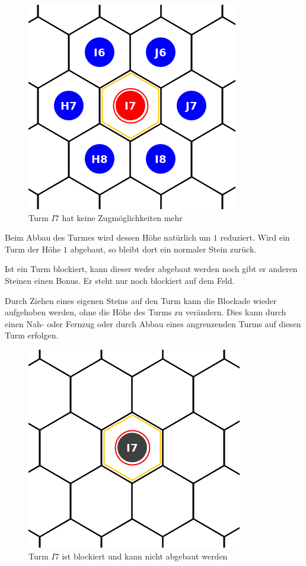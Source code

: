 \begin{figure}[ht]
\begin{center}
\includegraphics[scale=0.25]{graphic/neighbor-blocked-tower.png}
\end{center}
\caption*{Turm $I7$ hat keine Zugmöglichkeiten mehr}
\end{figure}

Beim Abbau des Turmes wird dessen Höhe natürlich um $1$ reduziert. Wird ein Turm der Höhe $1$ abgebaut, so bleibt dort ein normaler Stein zurück.

Ist ein Turm blockiert, kann dieser weder abgebaut werden noch gibt er anderen Steinen einen Bonus. Er steht nur noch blockiert auf dem Feld. 

Durch Ziehen eines eigenen Steins auf den Turm kann die Blockade wieder aufgehoben werden, ohne die Höhe des Turms zu verändern. Dies kann durch einen Nah- oder Fernzug oder durch Abbau eines angrenzenden Turms auf diesen Turm erfolgen.
\newpage
\begin{figure}[ht]
\begin{center}
\includegraphics[scale=0.25]{graphic/tower-blocked.png}
\end{center}
\caption*{Turm $I7$ ist blockiert und kann nicht abgebaut werden}
\end{figure}

